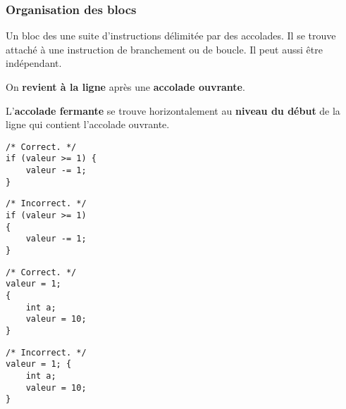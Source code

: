 \begin{frame}[fragile] \frametitle{Organisation des blocs}
Un \alert{bloc} des une suite d'instructions délimitée par des accolades.
Il se trouve attaché à une instruction de branchement ou de boucle. Il
peut aussi être indépendant.
\medskip

On {\bf revient à la ligne} après une {\bf accolade ouvrante}.
\medskip

L'{\bf accolade fermante} se trouve horizontalement au {\bf niveau du 
début} de la ligne qui contient l'accolade ouvrante.

\begin{multicols}{2}
\begin{lstlisting}
/* Correct. */
if (valeur >= 1) {
    valeur -= 1;
}
\end{lstlisting}
\bigskip

\begin{lstlisting}
/* Incorrect. */
if (valeur >= 1) 
{
    valeur -= 1;
}
\end{lstlisting}
\end{multicols}

\begin{multicols}{2}
\begin{lstlisting}
/* Correct. */
valeur = 1;
{
    int a;
    valeur = 10;
}
\end{lstlisting}

\begin{lstlisting}
/* Incorrect. */
valeur = 1; {
    int a;
    valeur = 10;
}
\end{lstlisting}

\end{multicols}
\end{frame}

